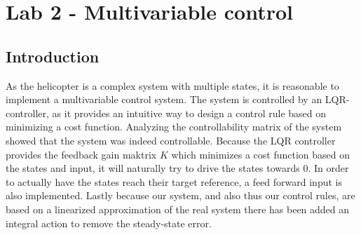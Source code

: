 \section{Lab 2 - Multivariable control}
\subsection{Introduction}
As the helicopter is a complex system with multiple states, it is reasonable to implement a multivariable control system.
The system is controlled by an LQR-controller, as it provides an intuitive way to design a control rule based on minimizing a cost function. 
Analyzing the controllability matrix of the system showed that the system was indeed controllable.
Because the LQR controller provides the feedback gain maktrix $K$ which minimizes a cost function based on the states and input, it will naturally try to drive the states towards 0. 
In order to actually have the states reach their target reference, a feed forward input is also implemented. 
Lastly because our system, and also thus our control rules, are based on a linearized approximation of the real system there has been added an integral action to remove the steady-state error.

